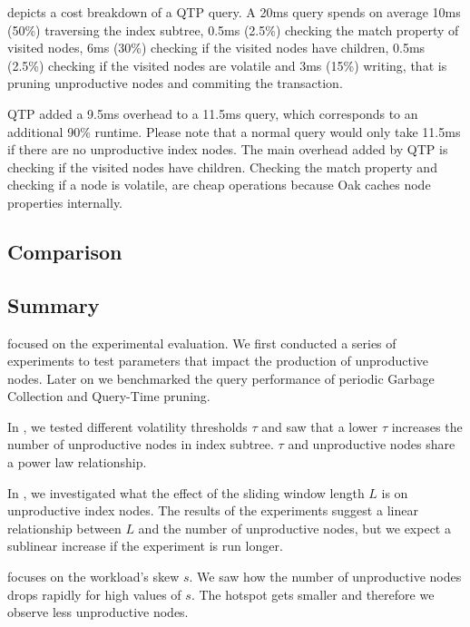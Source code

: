 \documentclass[abstracton,12pt]{scrartcl}
\theoremstyle{definition}
\begin{document}
 depicts a cost breakdown of a QTP query. A 20ms query
spends on average 10ms (50\%) traversing the index subtree, 0.5ms (2.5\%) checking
the match property of visited nodes, 6ms (30\%) checking if the visited nodes
have children, 0.5ms (2.5\%) checking if the visited nodes are volatile and 3ms
(15\%) writing, that is pruning unproductive nodes and commiting the transaction.

QTP added a 9.5ms overhead to a 11.5ms query, which corresponds to an additional 90\%
runtime. Please note that a normal query would only take 11.5ms if there are no
unproductive index nodes. The main overhead added by QTP is checking if the visited 
nodes have children. Checking the match property and checking if a node is volatile, 
are cheap operations because Oak caches node properties internally.

\subsection{Comparison}

\label{sec:comparison}

\subsection{Summary}

\label{sec:summary}

 focused on the experimental evaluation.
We first conducted a series of experiments to test parameters that
impact the production of unproductive nodes. Later on we benchmarked the
query performance of periodic Garbage Collection and Query-Time pruning.

In , we tested different volatility thresholds $\tau$
and saw that a lower $\tau$ increases the number of unproductive nodes in
index subtree. $\tau$ and unproductive nodes share a power law relationship.

In , we investigated what the effect of the
sliding window length $L$ is on unproductive index nodes. The results
of the experiments suggest a linear relationship between $L$ and the
number of unproductive nodes, but we expect a sublinear increase if
the experiment is run longer.

 focuses on the workload's skew $s$. We saw how the
number of unproductive nodes drops rapidly for high values of $s$.
The hotspot gets smaller and therefore we observe less unproductive nodes.
\end{document}
